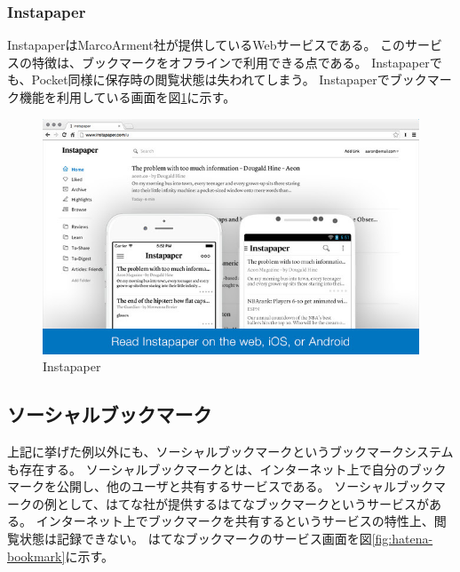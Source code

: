 \subsubsection{Instapaper}
InstapaperはMarcoArment社\cite{}が提供しているWebサービスである。
このサービスの特徴は、ブックマークをオフラインで利用できる点である。
Instapaperでも、Pocket同様に保存時の閲覧状態は失われてしまう。
Instapaperでブックマーク機能を利用している画面を図\ref{fig:instapaper}に示す。

\begin{figure}[htbp]
  \caption{Instapaper}
  \label{fig:instapaper}
  \begin{center}
    \includegraphics[bb=0 0 640 400,width=15cm]{img/020_related_works/instapaper.pdf}
  \end{center}
\end{figure}

\subsection{ソーシャルブックマーク}
上記に挙げた例以外にも、ソーシャルブックマークというブックマークシステムも存在する。
ソーシャルブックマークとは、インターネット上で自分のブックマークを公開し、他のユーザと共有するサービスである\cite{}。
ソーシャルブックマークの例として、はてな社\cite{}が提供するはてなブックマーク\cite{}というサービスがある。
インターネット上でブックマークを共有するというサービスの特性上、閲覧状態は記録できない。
はてなブックマークのサービス画面を図\ref{fig:hatena-bookmark}に示す。

